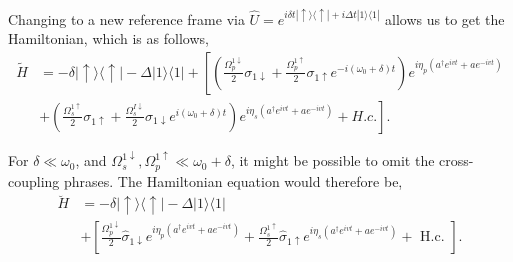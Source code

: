 Changing to a new reference frame via $\hat{U}=e^{i \delta t|\uparrow\rangle\langle\uparrow|+i \Delta t| 1\rangle\langle 1|}$ allows us to get the Hamiltonian, which is as follows,
\begin{equation}
    \begin{aligned}
        \widetilde{H} & =-\delta|\uparrow\rangle\langle\uparrow|-\Delta| 1\rangle\langle 1|+\left[\left(\frac{\Omega_p^{1 \downarrow}}{2} \sigma_{1 \downarrow}+\frac{\Omega_p^{1 \uparrow}}{2} \sigma_{1 \uparrow} e^{-i\left(\omega_0+\delta\right) t}\right) e^{i \eta_p\left(a^{\dagger} e^{i v t}+a e^{-i v t}\right)}\right. \\
                      & \left.+\left(\frac{\Omega_s^{1 \uparrow}}{2} \sigma_{1 \uparrow}+\frac{\Omega_s^{I \downarrow}}{2} \sigma_{1 \downarrow} e^{i\left(\omega_0+\delta\right) t}\right) e^{i \eta_s\left(a^{\dagger} e^{i v t}+a e^{-i v t}\right)}+H . c .\right] .
    \end{aligned}
\end{equation}

For $\delta\ll\omega_0$, and $\Omega_s^{1\downarrow},\Omega_p^{1\uparrow} \ll \omega_0+\delta$, it might be possible to omit the cross-coupling phrases. The Hamiltonian equation would therefore be,
\begin{equation}
    \begin{aligned}
        \breve{H} & =-\delta|\uparrow\rangle\langle\uparrow|-\Delta| 1\rangle\langle 1|                                                                                                                                                                                                            \\
                  & +\left[\frac{\Omega_p^{1 \downarrow}}{2} \hat{\sigma}_{1 \downarrow} e^{i \eta_p\left(a^{\dagger} e^{i v t}+a e^{-i v t}\right)}+\frac{\Omega_s^{1 \uparrow}}{2} \hat{\sigma}_{1 \uparrow} e^{i \eta_s\left(a^{\dagger} e^{i v t}+a e^{-i v t}\right)}+\text { H.c. }\right] .
    \end{aligned}
\end{equation}


